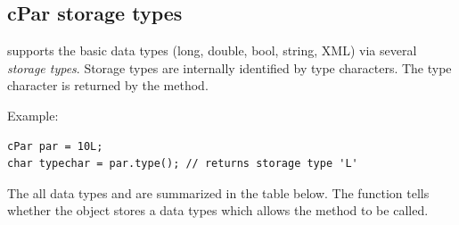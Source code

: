 \subsection{cPar storage types}

 supports the basic data types (long, double, bool, string, XML) via
several \textit{storage types}. Storage types are internally
identified by type characters. The type character is
returned by the  method.

Example:

\begin{verbatim}
cPar par = 10L;
char typechar = par.type(); // returns storage type 'L'
\end{verbatim}

The all  data types and are summarized in the table below.
The  function tells whether the object
stores a data types which allows the  method
to be called.

